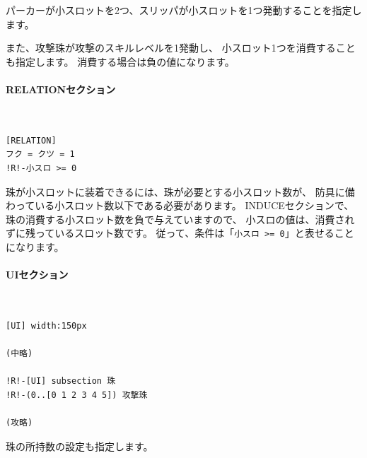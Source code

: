 \documentclass[dvipdfmx]{jsarticle}
\begin{document}
パーカーが小スロットを2つ、スリッパが小スロットを1つ発動することを指定します。

また、攻撃珠が攻撃のスキルレベルを1発動し、
小スロット1つを消費することも指定します。
消費する場合は負の値になります。

\paragraph{RELATIONセクション}~\medskip
{\footnotesize\begin{mdframed}\begin{Verbatim}[commandchars=!<>]
[RELATION]
フク = クツ = 1
!R!-小スロ >= 0
\end{Verbatim}
\end{mdframed}}
\medskip

珠が小スロットに装着できるには、珠が必要とする小スロット数が、
防具に備わっている小スロット数以下である必要があります。
INDUCEセクションで、珠の消費する小スロット数を負で与えていますので、
小スロの値は、消費されずに残っているスロット数です。
従って、条件は「\texttt{小スロ >= 0}」と表せることになります。

\paragraph{UIセクション}~\medskip
{\footnotesize\begin{mdframed}\begin{Verbatim}[commandchars=!<>]
[UI] width:150px

(中略)

!R!-[UI] subsection 珠
!R!-(0..[0 1 2 3 4 5]) 攻撃珠

(攻略)
\end{Verbatim}
\end{mdframed}}
\medskip

珠の所持数の設定も指定します。

\begin{center}
\end{center}
\end{document}
